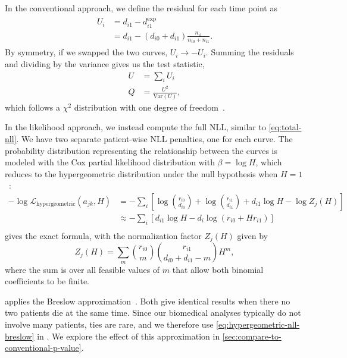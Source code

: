 \documentclass[article]{jss}
\begin{document}
In the conventional approach, we define the residual for each time point as
\begin{align}
\begin{aligned}
U_i&=d_{i1} - d_{i1}^\text{exp} \\
&=d_{i1} - (d_{i0} + d_{i1})\frac{n_{i1}}{n_{i0}+n_{i1}}.
\end{aligned}
\end{align}
By symmetry, if we swapped the two curves, \(U_i\rightarrow-U_i\).  Summing the residuals and dividing by the variance gives us the test statistic,
\begin{align}
U&=\sum_i U_i \\
Q&=\frac{U^2}{\text{Var}(U)},
\end{align}
which follows a \(\chi^2\) distribution with one degree of freedom~\citep[pp.~45--47]{mantel1966evaluation,peto1972asymptotically,appliedsurvivalanalysis}.

In the likelihood approach, we instead compute the full NLL, similar to \cref{eq:total-nll}.  We have two separate patient-wise NLL penalties, one for each curve.  The probability distribution representing the relationship between the curves is modeled with the Cox partial likelihood distribution with \(\beta=\log{H}\), which reduces to the hypergeometric distribution under the null hypothesis when \(H=1\)~\citep{cox1972regression,breslow1974covariance}:
\begin{align}
-\log \mathcal{L}_{\text{hypergeometric}}(a_{jk}, H)&=-\sum_i\left[\log\binom{r_{i0}}{d_{i0}}+\log\binom{r_{i1}}{d_{i1}}+d_{i1}\log H-\log Z_j(H)\right] \label{eq:hypergeometric-nll-exact}\\
&\approx-\sum_i \left[d_{i1} \log H - d_i \log\left(r_{i0} + H r_{i1}\right)\right] \label{eq:hypergeometric-nll-breslow}\\
\end{align}
 gives the exact formula, with the normalization factor \(Z_j(H)\) given by
\begin{equation}
Z_j(H) = \sum_{m}\binom{r_{i0}}{m}\binom{r_{i1}}{d_{i0}+d_{i1}-m}H^m,
\label{eq:hypergeometric-normalization}
\end{equation}
where the sum is over all feasible values of \(m\) that allow both binomial coefficients to be finite.

 applies the Breslow approximation~\citep{breslow1974covariance}.  Both give identical results when there no two patients die at the same time.  Since our biomedical analyses typically do not involve many patients, ties are rare, and we therefore use \cref{eq:hypergeometric-nll-breslow} in .  We explore the effect of this approximation in \cref{sec:compare-to-conventional-p-value}.
\end{document}
